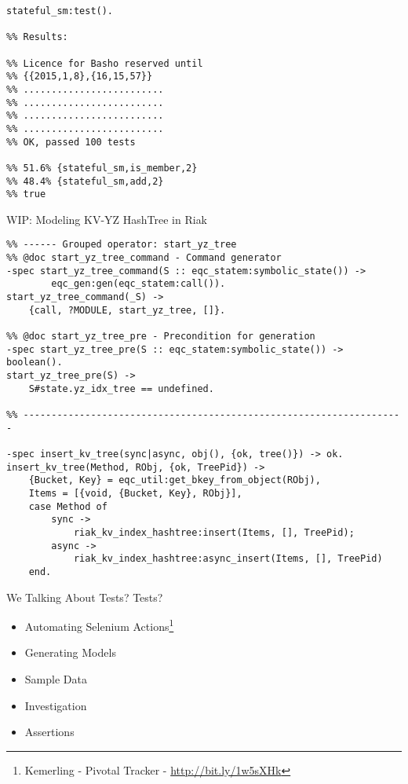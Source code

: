 \documentclass[presentation, bigger]{beamer}
\begin{document}
\begin{frame}[fragile,shrink,label=sec-]{}
 \begin{verbatim}
stateful_sm:test().

%% Results:

%% Licence for Basho reserved until
%% {{2015,1,8},{16,15,57}}
%% .........................
%% .........................
%% .........................
%% .........................
%% OK, passed 100 tests

%% 51.6% {stateful_sm,is_member,2}
%% 48.4% {stateful_sm,add,2}
%% true
\end{verbatim}
\end{frame}
\begin{frame}[fragile,shrink,label=sec-]{WIP: Modeling KV-YZ HashTree in Riak}
 \begin{verbatim}
%% ------ Grouped operator: start_yz_tree
%% @doc start_yz_tree_command - Command generator
-spec start_yz_tree_command(S :: eqc_statem:symbolic_state()) ->
        eqc_gen:gen(eqc_statem:call()).
start_yz_tree_command(_S) ->
    {call, ?MODULE, start_yz_tree, []}.

%% @doc start_yz_tree_pre - Precondition for generation
-spec start_yz_tree_pre(S :: eqc_statem:symbolic_state()) -> boolean().
start_yz_tree_pre(S) ->
    S#state.yz_idx_tree == undefined.

%% --------------------------------------------------------------------

-spec insert_kv_tree(sync|async, obj(), {ok, tree()}) -> ok.
insert_kv_tree(Method, RObj, {ok, TreePid}) ->
    {Bucket, Key} = eqc_util:get_bkey_from_object(RObj),
    Items = [{void, {Bucket, Key}, RObj}],
    case Method of
        sync ->
            riak_kv_index_hashtree:insert(Items, [], TreePid);
        async ->
            riak_kv_index_hashtree:async_insert(Items, [], TreePid)
    end.
\end{verbatim}
\end{frame}
\begin{frame}[label=sec-]{We Talking About Tests? Tests?}
\begin{itemize}
\item Automating Selenium Actions\footnote{Kemerling - Pivotal Tracker -  \url{http://bit.ly/1w5sXHk}}
\item Generating Models
\item Sample Data
\item Investigation
\item Assertions
\end{itemize}
\end{frame}
\end{document}
